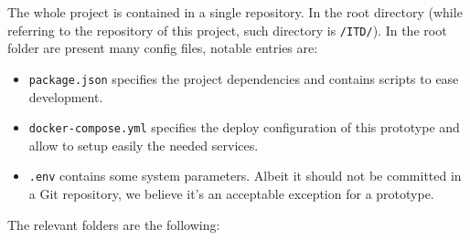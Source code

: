 \documentclass[
]{article}
\begin{document}
The whole project is contained in a single repository. In the root directory (while referring to the repository of this project, such directory is \texttt{/ITD/}). In the root folder are present many config files, notable entries are:
\begin{itemize}
  \item \texttt{package.json} specifies the project dependencies and contains scripts to ease development.
  \item \texttt{docker-compose.yml} specifies the deploy configuration of this prototype and allow to setup easily the needed services.
  \item \texttt{.env} contains some system parameters. Albeit it should not be committed in a Git repository, we believe it's an acceptable exception for a prototype.
\end{itemize}

The relevant folders are the following:
\end{document}
